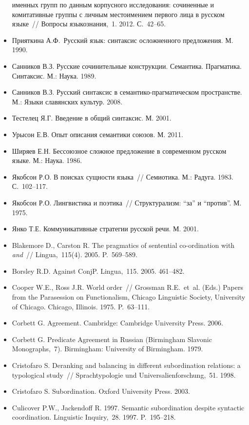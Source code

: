 \begin{itemize}
  именных групп по данным корпусного исследования: сочиненные и
  комитативные группы с личным местоимением первого лица в русском
  языке~// Вопросы языкознания,~1. 2012. С.~42--65.
\item
  Прияткина А.Ф.~Русский язык: синтаксис осложненного предложения. М.
  1990.
\item
  Санников В.З. Русские сочинительные конструкции. Семантика.
  Прагматика. Синтаксис. М.: Наука. 1989.
\item
  Санников В.З. Русский синтаксис в семантико-прагматическом
  пространстве. М.: Языки славянских культур. 2008.
\item
  Тестелец Я.Г. Введение в общий синтаксис. М. 2001.
\item
  Урысон Е.В. Опыт описания семантики союзов. М. 2011.
\item
  Ширяев Е.Н. Бессоюзное сложное предложение в современном русском
  языке. М.: Наука. 1986.
\item
  Якобсон Р.О. В поисках сущности языка~// Семиотика. М.: Радуга. 1983.
  С.~102--117.
\item
  Якобсон Р.О. Лингвистика и поэтика~// Структурализм: ``за'' и
  ``против''. М. 1975.
\item
  Янко Т.Е. Коммуникативные стратегии русской речи. М. 2001.
\item
  Blakemore D., Carston R. The pragmatics of sentential co-ordination
  with \emph{and}~// Lingua,~115(4). 2005. P.~569--589.
\item
  Borsley R.D. Against ConjP. Lingua,~115. 2005. 461--482.
\item
  Cooper W.E., Ross J.R. World order~// Grossman R.E.~et~al. (Eds.)
  Papers from the Parasession on Functionalism, Chicago Linguistic
  Society, University of Chicago. Chicago, Illinois. 1975. P.~63--111.
\item
  Corbett G. Agreement. Cambridge: Cambridge University Press. 2006.
\item
  Corbett G. Predicate Agreement in Russian (Birmingham Slavonic
  Monographs,~7). Birmingham: University of Birmingham. 1979.
\item
  Cristofaro S. Deranking and balancing in different subordination
  relations: a typological study~// Sprachtypologie und
  Universalienforschung,~51. 1998.
\item
  Cristofaro S. Subordination. Oxford University Press. 2003.
\item
  Culicover P.W., Jackendoff R. 1997. Semantic subordination despite
  syntactic coordination. Linguistic Inquiry,~28. 1997. P.~195--218.

\end{itemize}
